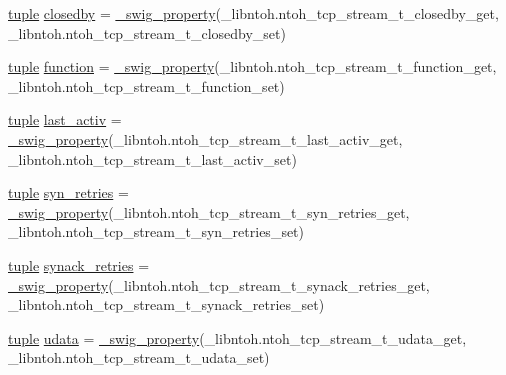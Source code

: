\begin{DoxyCompactItemize}
\item 
\hyperlink{classlibntoh_1_1ntoh__tcp__stream__t_a945ee80121c935cc2e86d758ecc70579}{tuple} \hyperlink{classlibntoh_1_1ntoh__tcp__stream__t_a736d15e1443bece09d760478e5f42c09}{closedby} = \hyperlink{namespacelibntoh_ae6f5626f776538e0cdb00e75ca1c96c9}{\-\_\-swig\-\_\-property}(\-\_\-libntoh.\-ntoh\-\_\-tcp\-\_\-stream\-\_\-t\-\_\-closedby\-\_\-get, \-\_\-libntoh.\-ntoh\-\_\-tcp\-\_\-stream\-\_\-t\-\_\-closedby\-\_\-set)
\item 
\hyperlink{classlibntoh_1_1ntoh__tcp__stream__t_a945ee80121c935cc2e86d758ecc70579}{tuple} \hyperlink{classlibntoh_1_1ntoh__tcp__stream__t_a543077174a1281b9d00884a11a040629}{function} = \hyperlink{namespacelibntoh_ae6f5626f776538e0cdb00e75ca1c96c9}{\-\_\-swig\-\_\-property}(\-\_\-libntoh.\-ntoh\-\_\-tcp\-\_\-stream\-\_\-t\-\_\-function\-\_\-get, \-\_\-libntoh.\-ntoh\-\_\-tcp\-\_\-stream\-\_\-t\-\_\-function\-\_\-set)
\item 
\hyperlink{classlibntoh_1_1ntoh__tcp__stream__t_a945ee80121c935cc2e86d758ecc70579}{tuple} \hyperlink{classlibntoh_1_1ntoh__tcp__stream__t_a43a06ba72aed8671dd1579dbf6f78b1a}{last\-\_\-activ} = \hyperlink{namespacelibntoh_ae6f5626f776538e0cdb00e75ca1c96c9}{\-\_\-swig\-\_\-property}(\-\_\-libntoh.\-ntoh\-\_\-tcp\-\_\-stream\-\_\-t\-\_\-last\-\_\-activ\-\_\-get, \-\_\-libntoh.\-ntoh\-\_\-tcp\-\_\-stream\-\_\-t\-\_\-last\-\_\-activ\-\_\-set)
\item 
\hyperlink{classlibntoh_1_1ntoh__tcp__stream__t_a945ee80121c935cc2e86d758ecc70579}{tuple} \hyperlink{classlibntoh_1_1ntoh__tcp__stream__t_a01107768ed3836fe4c2f2072c1c789c6}{syn\-\_\-retries} = \hyperlink{namespacelibntoh_ae6f5626f776538e0cdb00e75ca1c96c9}{\-\_\-swig\-\_\-property}(\-\_\-libntoh.\-ntoh\-\_\-tcp\-\_\-stream\-\_\-t\-\_\-syn\-\_\-retries\-\_\-get, \-\_\-libntoh.\-ntoh\-\_\-tcp\-\_\-stream\-\_\-t\-\_\-syn\-\_\-retries\-\_\-set)
\item 
\hyperlink{classlibntoh_1_1ntoh__tcp__stream__t_a945ee80121c935cc2e86d758ecc70579}{tuple} \hyperlink{classlibntoh_1_1ntoh__tcp__stream__t_a1a6b192c6b711327b1c200ab48945023}{synack\-\_\-retries} = \hyperlink{namespacelibntoh_ae6f5626f776538e0cdb00e75ca1c96c9}{\-\_\-swig\-\_\-property}(\-\_\-libntoh.\-ntoh\-\_\-tcp\-\_\-stream\-\_\-t\-\_\-synack\-\_\-retries\-\_\-get, \-\_\-libntoh.\-ntoh\-\_\-tcp\-\_\-stream\-\_\-t\-\_\-synack\-\_\-retries\-\_\-set)
\item 
\hyperlink{classlibntoh_1_1ntoh__tcp__stream__t_a945ee80121c935cc2e86d758ecc70579}{tuple} \hyperlink{classlibntoh_1_1ntoh__tcp__stream__t_a6900744e840ca75a67e020c38d143891}{udata} = \hyperlink{namespacelibntoh_ae6f5626f776538e0cdb00e75ca1c96c9}{\-\_\-swig\-\_\-property}(\-\_\-libntoh.\-ntoh\-\_\-tcp\-\_\-stream\-\_\-t\-\_\-udata\-\_\-get, \-\_\-libntoh.\-ntoh\-\_\-tcp\-\_\-stream\-\_\-t\-\_\-udata\-\_\-set)

\end{DoxyCompactItemize}
